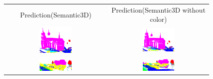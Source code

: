     \begin{figure}[h!]
        \centering
        \begin{tabular}{cc}
            Prediction(Semantic3D) & Prediction(Semantic3D without color)\\
            \includegraphics[width=0.33\textwidth, height=0.18\textheight]{images/ood_imgs/de_sem3d/de_class_prob_1.png}&
            \includegraphics[width=0.33\textwidth, height=0.18\textheight]{images/sem3d_of/de_sem3d_of_1.png}\\

            \includegraphics[width=0.33\textwidth, height=0.18\textheight]{images/ood_imgs/de_sem3d/de_class_prob_2.png}&
            \includegraphics[width=0.33\textwidth, height=0.18\textheight]{images/sem3d_of/de_sem3d_of_2.png}\\


\end{tabular}
\end{figure}
